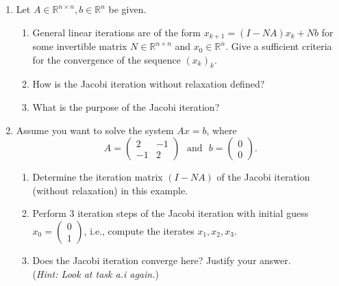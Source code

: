 \vspace*{-0.5cm}
\begin{enumerate}
	\item  Let $A\in\mathbb{R}^{n \times n}, b\in\mathbb{R}^n$ be given.	
\begin{enumerate}%
	\item 	General linear iterations are of the form $x_{k+1} = (I-NA)x_k + Nb$ for some invertible matrix $N\in\mathbb{R}^{n \times n}$ and $x_0 \in\mathbb{R}^n$. Give a sufficient criteria for the convergence of the sequence $(x_k)_k$.
		\item How is the Jacobi iteration without relaxation defined?
		\item What is the purpose of the Jacobi iteration?
	\end{enumerate}

	\item Assume you want to solve the system $Ax = b$, where
	$$A = \begin{pmatrix}
	2&-1\\
-1&2
	\end{pmatrix}~~~\text{and}~~~b = \begin{pmatrix}
	0\\0
	\end{pmatrix} .$$
 
\begin{enumerate}%
	\item Determine the iteration matrix $(I-NA)$ of the Jacobi iteration (without relaxation) in this example.
	\item Perform $3$ iteration steps of the Jacobi iteration with initial guess $x_0 = \begin{pmatrix}
	0\\1
	\end{pmatrix}$, i.e., compute the iterates $x_1, x_2, x_3$. 
	\item Does the Jacobi iteration converge here? Justify your answer.\\
	(\textit{Hint: Look at task a.i again.})
\end{enumerate}
\end{enumerate}
